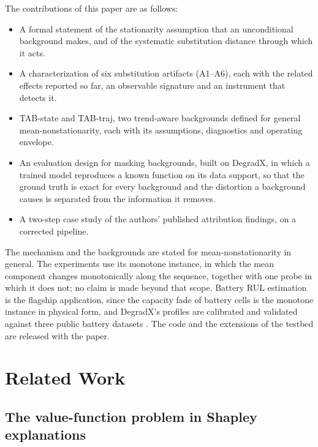 \documentclass{article}
\begin{document}
The contributions of this paper are as follows:
\begin{itemize}
    \item A formal statement of the stationarity assumption that an unconditional background makes, and of the systematic substitution distance through which it acts.
    \item A characterization of six substitution artifacts (A1--A6), each with the related effects reported so far, an observable signature and an instrument that detects it.
    \item TAB-state and TAB-traj, two trend-aware backgrounds defined for general mean-nonstationarity, each with its assumptions, diagnostics and operating envelope.
    \item An evaluation design for masking backgrounds, built on DegradX, in which a trained model reproduces a known function on its data support, so that the ground truth is exact for every background and the distortion a background causes is separated from the information it removes.
    \item A two-step case study of the authors' published attribution findings, on a corrected pipeline.
\end{itemize}
The mechanism and the backgrounds are stated for mean-nonstationarity in general. The experiments use its monotone instance, in which the mean component changes monotonically along the sequence, together with one probe in which it does not; no claim is made beyond that scope. Battery RUL estimation is the flagship application, since the capacity fade of battery cells is the monotone instance in physical form, and DegradX's profiles are calibrated and validated against three public battery datasets \citep{severson2019data, ma2022real, cui2024data}. The code and the extensions of the testbed are released with the paper.


\section{Related Work}
\label{sec:related}

\subsection{The value-function problem in Shapley explanations}
\label{sec:related:offmanifold}
\end{document}

